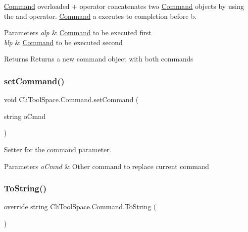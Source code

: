 \mbox{\hyperlink{class_cli_tool_space_1_1_command}{Command}} overloaded + operator concatenates two \mbox{\hyperlink{class_cli_tool_space_1_1_command}{Command}} objects by using the and operator. \mbox{\hyperlink{class_cli_tool_space_1_1_command}{Command}} a executes to completion before b. 


\begin{DoxyParams}{Parameters}
{\em alp} & \mbox{\hyperlink{class_cli_tool_space_1_1_command}{Command}} to be executed first\\
\hline
{\em blp} & \mbox{\hyperlink{class_cli_tool_space_1_1_command}{Command}} to be executed second\\
\hline
\end{DoxyParams}
\begin{DoxyReturn}{Returns}
Returns a new command object with both commands
\end{DoxyReturn}
\mbox{\label{class_cli_tool_space_1_1_command_a81c6eafab4f24091f8cb795b1bc50a17}} 
\subsubsection{\texorpdfstring{setCommand()}{setCommand()}}
{\footnotesize\ttfamily void Cli\+Tool\+Space.\+Command.\+set\+Command (\begin{DoxyParamCaption}\item[{string}]{o\+Cmnd }\end{DoxyParamCaption})}



Setter for the command parameter. 


\begin{DoxyParams}{Parameters}
{\em o\+Cmnd} & Other command to replace current command\\
\hline
\end{DoxyParams}
\mbox{\label{class_cli_tool_space_1_1_command_a0eb86154a0dd76853a440baec69c406d}} 
\subsubsection{\texorpdfstring{ToString()}{ToString()}}
{\footnotesize\ttfamily override string Cli\+Tool\+Space.\+Command.\+To\+String (\begin{DoxyParamCaption}{ }\end{DoxyParamCaption})}



